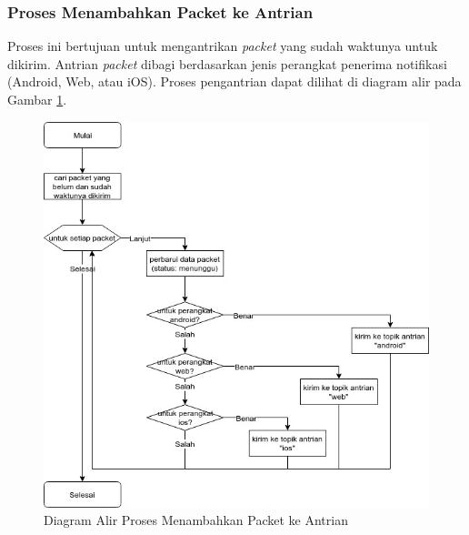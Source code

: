 \subsubsection{Proses Menambahkan Packet ke Antrian}
\label{3:proses_menambahkan_packet_ke_antrian}
\par Proses ini bertujuan untuk mengantrikan \textit{packet} yang sudah waktunya untuk dikirim.
Antrian \textit{packet} dibagi berdasarkan jenis perangkat penerima notifikasi (Android, Web, atau iOS). Proses pengantrian dapat dilihat di diagram alir pada Gambar \ref{flowchart_menambahkan_packet_ke_antrian}.
\begin{figure}[hb]
	\caption{Diagram Alir Proses Menambahkan Packet ke Antrian} \label{flowchart_menambahkan_packet_ke_antrian}
    \centering\includegraphics[width=1\textwidth]{bab3/figures/flowchart_menambahkan_packet_ke_antrian.jpg}
\end{figure}

